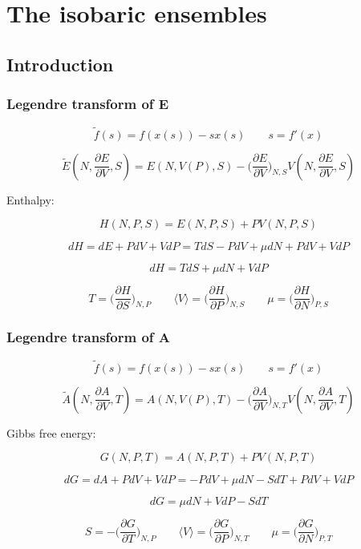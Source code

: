 \chapter{The isobaric ensembles}

\section{Introduction}

	\subsection{Legendre transform of E}

	$$\tilde{f}(s) = f(x(s))-sx(s)\qquad s = f'(x)$$

	$$\tilde{E}(N, \frac{\partial E}{\partial V}, S) = E(N, V(P), S) - \biggl(\frac{\partial E}{\partial V}\biggr)_{N, S}V(N, \frac{\partial E}{\partial V}, S)$$

	Enthalpy:

	$$H(N, P, S) = E(N, P, S) + PV(N, P, S)$$

	$$dH = dE + PdV + VdP = TdS - PdV + \mu dN + PdV + VdP$$

	$$dH = TdS + \mu dN + VdP$$

	$$T = \biggl(\frac{\partial H}{\partial S}\biggr)_{N, P} \qquad \langle V\rangle = \biggl(\frac{\partial H}{\partial P}\biggr)_{N, S} \qquad \mu = \biggl(\frac{\partial H}{\partial N}\biggr)_{P, S}$$

	\subsection{Legendre transform of A}

	$$\tilde{f}(s) = f(x(s))-sx(s)\qquad s = f'(x)$$

	$$\tilde{A}(N, \frac{\partial A}{\partial V}, T) = A(N, V(P), T)- \biggl(\frac{\partial A}{\partial V}\biggr)_{N, T}V(N, \frac{\partial A}{\partial V}, T)$$

	Gibbs free energy:

	$$G(N, P, T) = A(N, P, T) + PV(N, P, T)$$

	$$dG = dA + PdV + VdP = -PdV + \mu dN - SdT + PdV + VdP$$

	$$dG = \mu dN + VdP - SdT$$

	$$S = -\biggl(\frac{\partial G}{\partial T}\biggr)_{N, P}\qquad\langle V\rangle = \biggl(\frac{\partial G}{\partial P}\biggr)_{N, T}\qquad \mu = \biggl(\frac{\partial G}{\partial N}\biggr)_{P, T}$$

